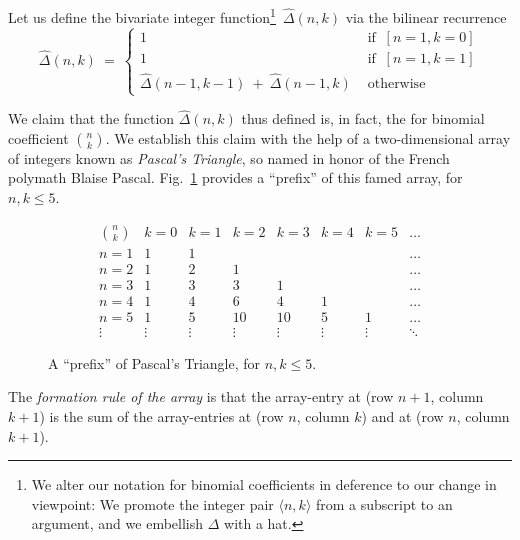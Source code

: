\smallskip

Let us define the bivariate integer function\footnote{We alter our
  notation for binomial coefficients in deference to our change in
  viewpoint: We promote the integer pair $\langle n,k \rangle$ from a
  subscript to an argument, and we embellish $\Delta$ with a
  hat.}~$\hat{\Delta}(n,k)$ via the bilinear recurrence
\begin{equation}
\label{eq:binom-coeff-recurrence}
\hat{\Delta}(n,k) \ = \ 
\left\{
\begin{array}{cl}
1  & \mbox{ if } \ [n=1, k=0] \\
1  & \mbox{ if } \ [n=1, k=1] \\
\hat{\Delta}(n-1, k-1) \ + \  \hat{\Delta}(n-1,k) & \mbox{ otherwise}
\end{array}
\right.
\end{equation}

\smallskip

We claim that the function $\hat{\Delta}(n,k)$ thus defined is, in
fact, the for binomial coefficient $\displaystyle {n \choose k}$.  We
establish this claim with the help of a two-dimensional array of
integers known as {\it Pascal's Triangle},
so named in honor of the French polymath Blaise Pascal.
Fig.~\ref{fig:pascal-triangle} provides a ``prefix'' of this famed
array, for $n,k \leq 5$.
\begin{figure}[htb]
\[
\begin{array}{c||r|r|r|r|r|r|r}
{\displaystyle {n \choose k}} & k=0 & k=1 & k=2 & k=3 & k=4 & k=5 &\ldots \\
\hline
\hline
n=1 & 1 & 1 &    &    &    &   & \ldots \\
\hline
n=2 & 1 & 2 & 1  &    &    &   & \ldots \\
\hline
n=3 & 1 & 3 & 3  & 1  &    &   & \ldots \\
\hline
n=4 & 1 & 4 & 6  & 4  & 1  &   & \ldots \\
\hline
n=5 & 1 & 5 & 10 & 10 & 5  & 1 & \ldots \\
\hline
\vdots &\vdots &\vdots &\vdots &\vdots &\vdots &\vdots &\ddots
\end{array}
\]
\caption{A ``prefix'' of Pascal's Triangle, for $n,k \leq 5$.}
\label{fig:pascal-triangle}
\end{figure}
The {\em formation rule of the array} is that the array-entry at (row
$n+1$, column $k+1$) is the sum of the array-entries at (row $n$, column
$k$) and at (row $n$, column $k+1$).

